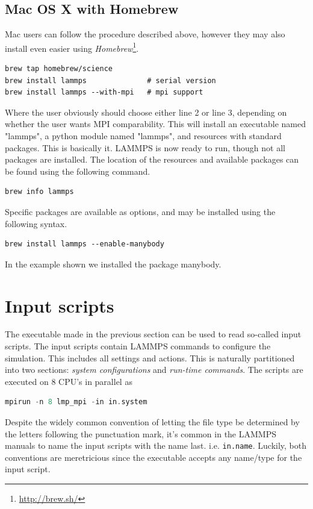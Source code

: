 \documentclass[twoside,english]{uiofysmaster}
\begin{document}
\subsection{Mac OS X with Homebrew}
Mac users can follow the procedure described above, however they may also install even easier using \textit{Homebrew}\footnote{\href{http://brew.sh/}{http://brew.sh/}}. 
\begin{lstlisting}
brew tap homebrew/science
brew install lammps              # serial version
brew install lammps --with-mpi   # mpi support 
\end{lstlisting}
Where the user obviously should choose either line 2 or line 3, depending on whether the user wants MPI comparability.
This will install an executable named "lammps", a python module named "lammps", and resources with standard packages. 
This is basically it. LAMMPS is now ready to run, though not all packages are installed.
The location of the resources and available packages can be found using the following command.
\begin{lstlisting}
brew info lammps 
\end{lstlisting}
Specific packages are available as options, and may be installed using the following syntax.

\begin{lstlisting}
brew install lammps --enable-manybody 
\end{lstlisting}
In the example shown we installed the package manybody.





\section{Input scripts}
The executable made in the previous section can be used to read so-called input scripts. 
The input scripts contain LAMMPS commands to configure the simulation. This includes all settings and actions. 
This is naturally partitioned into two sections: \textit{system configurations} and \textit{run-time commands}.
The scripts are executed on 8 CPU's in parallel as
\begin{lstlisting}[language=c++]
mpirun -n 8 lmp_mpi -in in.system
\end{lstlisting} 
Despite the widely common convention of letting the file type be determined by the letters following the punctuation mark, it's common in the LAMMPS manuals to name the input scripts with the name last. i.e. \texttt{in.name}. Luckily, both conventions are meretricious since the executable accepts any name/type for the input script.
\end{document}
